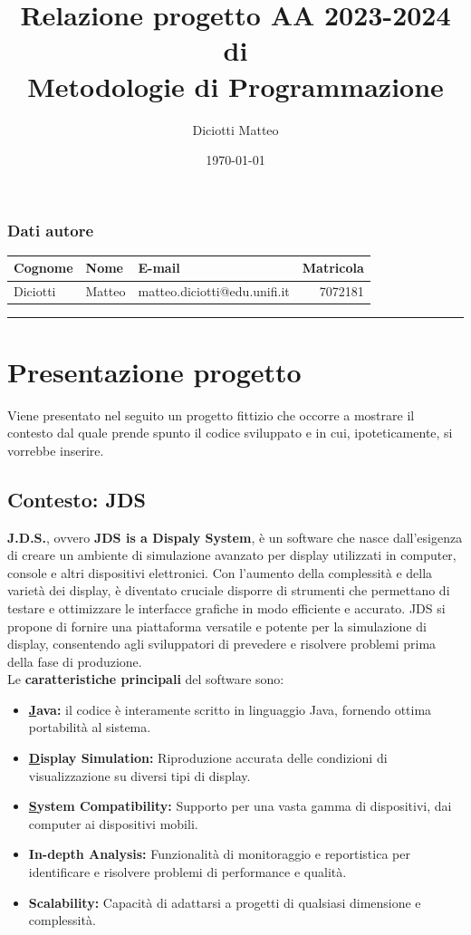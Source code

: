 \documentclass[a4paper,11pt]{article}
\author{Diciotti Matteo}
\title{Relazione progetto AA 2023-2024 di\\ \textbf{Metodologie di Programmazione}}
\date{\today}
\begin{document}
	
	\maketitle
	
	\subsubsection*{Dati autore}
	\begin{tabularx}{\textwidth}{l l >{\raggedleft\arraybackslash}X r}
		\textbf{Cognome} & \textbf{Nome} & \textbf{E-mail} & \textbf{Matricola}\\\toprule
		Diciotti & Matteo & matteo.diciotti@edu.unifi.it & 7072181
	\end{tabularx}
	\vspace{6em}
	\tableofcontents
	\vspace{1em}\noindent\rule{\textwidth}{2pt}
	
	\newpage
	\section{Presentazione progetto}
	Viene presentato nel seguito un progetto fittizio che occorre a mostrare il contesto dal quale prende spunto il codice sviluppato e in cui, ipoteticamente, si vorrebbe inserire.
	\subsection{Contesto: JDS} \label{jds}
	\textbf{J.D.S.}, ovvero \textbf{JDS is a Dispaly System}, è un software che nasce dall’esigenza di creare un ambiente di simulazione avanzato per display utilizzati in computer, console e altri dispositivi elettronici. Con l’aumento della complessità e della varietà dei display, è diventato cruciale disporre di strumenti che permettano di testare e ottimizzare le interfacce grafiche in modo efficiente e accurato. JDS si propone di fornire una piattaforma versatile e potente per la simulazione di display, consentendo agli sviluppatori di prevedere e risolvere problemi prima della fase di produzione.\\
	Le \textbf{caratteristiche principali} del software sono:
	\begin{itemize}\setlength\itemsep{-3pt}		
		\item \textbf{\underline{J}ava:} il codice è interamente scritto in linguaggio Java, fornendo ottima portabilità al sistema.
		\item \textbf{\underline{D}isplay Simulation:} Riproduzione accurata delle condizioni di visualizzazione su diversi tipi di display.
		\item \textbf{\underline{S}ystem Compatibility:} Supporto per una vasta gamma di dispositivi, dai computer ai dispositivi mobili.
		\item \textbf{In-depth Analysis:} Funzionalità di monitoraggio e reportistica per identificare e risolvere problemi di performance e qualità.
		\item \textbf{Scalability:} Capacità di adattarsi a progetti di qualsiasi dimensione e complessità.
	\end{itemize}	
\end{document}

